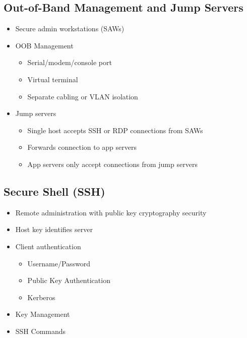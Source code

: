 	\subsection {Out-of-Band Management and Jump Servers}
		\begin{itemize}
			\item Secure admin workstations (SAWs)
			\item OOB Management
				\begin{itemize}
					\item Serial/modem/console port
					\item Virtual terminal
					\item Separate cabling or VLAN isolation
				\end{itemize}
			\item Jump servers
				\begin{itemize}
					\item Single host accepts SSH or RDP connections from SAWs
					\item Forwards connection to app servers
					\item App servers only accept connections from jump servers
				\end{itemize}
		\end{itemize}
	\subsection {Secure Shell (SSH)}
		\begin{itemize}
			\item Remote administration with public key cryptography security
			\item Host key identifies server
			\item Client authentication
				\begin{itemize}
					\item Username/Password
					\item Public Key Authentication
					\item Kerberos
				\end{itemize}
			\item Key Management
			\item SSH Commands
		\end{itemize}
